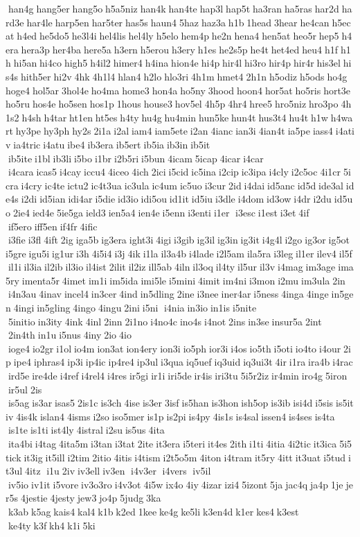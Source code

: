  han4g hang5er hang5o h5a5niz han4k han4te hap3l hap5t ha3ran ha5ras har2d hard3e har4le harp5en har5ter has5s haun4 5haz haz3a h1b 1head 3hear he4can h5ecat h4ed he5do5 he3l4i hel4lis hel4ly h5elo hem4p he2n hena4 hen5at heo5r hep5 h4era hera3p her4ba here5a h3ern h5erou h3ery h1es he2s5p he4t het4ed heu4 h1f h1h hi5an hi4co high5 h4il2 himer4 h4ina hion4e hi4p hir4l hi3ro hir4p hir4r his3el his4s hith5er hi2v 4hk 4h1l4 hlan4 h2lo hlo3ri 4h1m hmet4 2h1n h5odiz h5ods ho4g hoge4 hol5ar 3hol4e ho4ma home3 hon4a ho5ny 3hood hoon4 hor5at ho5ris hort3e ho5ru hos4e ho5sen hos1p 1hous house3 hov5el 4h5p 4hr4 hree5 hro5niz hro3po 4h1s2 h4sh h4tar ht1en ht5es h4ty hu4g hu4min hun5ke hun4t hus3t4 hu4t h1w h4wart hy3pe hy3ph hy2s 2i1a i2al iam4 iam5ete i2an 4ianc ian3i 4ian4t ia5pe iass4 i4ativ ia4tric i4atu ibe4 ib3era ib5ert ib5ia ib3in ib5it  ib5ite i1bl ib3li i5bo i1br i2b5ri i5bun 4icam 5icap 4icar i4car  i4cara icas5 i4cay iccu4 4iceo 4ich 2ici i5cid ic5ina i2cip ic3ipa i4cly i2c5oc 4i1cr 5icra i4cry ic4te ictu2 ic4t3ua ic3ula ic4um ic5uo i3cur 2id i4dai id5anc id5d ide3al ide4s i2di id5ian idi4ar i5die id3io idi5ou id1it id5iu i3dle i4dom id3ow i4dr i2du id5uo 2ie4 ied4e 5ie5ga ield3 ien5a4 ien4e i5enn i3enti i1er  i3esc i1est i3et 4if  if5ero iff5en if4fr 4ific  i3fie i3fl 4ift 2ig iga5b ig3era ight3i 4igi i3gib ig3il ig3in ig3it i4g4l i2go ig3or ig5ot i5gre igu5i ig1ur i3h 4i5i4 i3j 4ik i1la il3a4b i4lade i2l5am ila5ra i3leg il1er ilev4 il5f il1i il3ia il2ib il3io il4ist 2ilit il2iz ill5ab 4iln il3oq il4ty il5ur il3v i4mag im3age ima5ry imenta5r 4imet im1i im5ida imi5le i5mini 4imit im4ni i3mon i2mu im3ula 2in  i4n3au 4inav incel4 in3cer 4ind in5dling 2ine i3nee iner4ar i5ness 4inga 4inge in5gen 4ingi in5gling 4ingo 4ingu 2ini i5ni  i4nia in3io in1is i5nite  5initio in3ity 4ink 4inl 2inn 2i1no i4no4c ino4s i4not 2ins in3se insur5a 2int  2in4th in1u i5nus 4iny 2io 4io  ioge4 io2gr i1ol io4m ion3at ion4ery ion3i io5ph ior3i i4os io5th i5oti io4to i4our 2ip ipe4 iphras4 ip3i ip4ic ip4re4 ip3ul i3qua iq5uef iq3uid iq3ui3t 4ir i1ra ira4b i4rac ird5e ire4de i4ref i4rel4 i4res ir5gi ir1i iri5de ir4is iri3tu 5i5r2iz ir4min iro4g 5iron  ir5ul 2is  is5ag is3ar isas5 2is1c is3ch 4ise is3er 3isf is5han is3hon ish5op is3ib isi4d i5sis is5itiv 4is4k islan4 4isms i2so iso5mer is1p is2pi is4py 4is1s is4sal issen4 is4ses is4ta  is1te is1ti ist4ly 4istral i2su is5us 4ita  ita4bi i4tag 4ita5m i3tan i3tat 2ite it3era i5teri it4es 2ith i1ti 4itia 4i2tic it3ica 5i5tick it3ig it5ill i2tim 2itio 4itis i4tism i2t5o5m 4iton i4tram it5ry 4itt it3uat i5tud it3ul 4itz  i1u 2iv iv3ell iv3en  i4v3er  i4vers  iv5il  iv5io iv1it i5vore iv3o3ro i4v3ot 4i5w ix4o 4iy 4izar izi4 5izont 5ja jac4q ja4p 1je jer5s 4jestie 4jesty jew3 jo4p 5judg 3ka  k3ab k5ag kais4 kal4 k1b k2ed 1kee ke4g ke5li k3en4d k1er kes4 k3est  ke4ty k3f kh4 k1i 5ki 